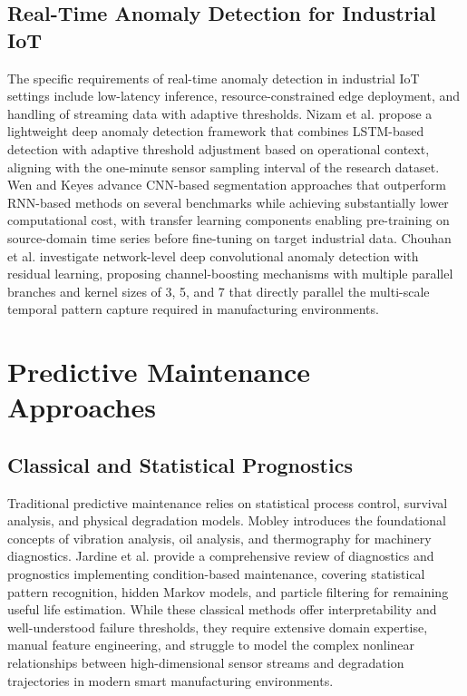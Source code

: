 \subsection{Real-Time Anomaly Detection for Industrial IoT}

The specific requirements of real-time anomaly detection in industrial IoT settings include low-latency inference, resource-constrained edge deployment, and handling of streaming data with adaptive thresholds. Nizam et al. \cite{nizam_real-time_2022} propose a lightweight deep anomaly detection framework that combines LSTM-based detection with adaptive threshold adjustment based on operational context, aligning with the one-minute sensor sampling interval of the research dataset. Wen and Keyes \cite{wen_time_2019} advance CNN-based segmentation approaches that outperform RNN-based methods on several benchmarks while achieving substantially lower computational cost, with transfer learning components enabling pre-training on source-domain time series before fine-tuning on target industrial data. Chouhan et al. \cite{Chouhan2019} investigate network-level deep convolutional anomaly detection with residual learning, proposing channel-boosting mechanisms with multiple parallel branches and kernel sizes of 3, 5, and 7 that directly parallel the multi-scale temporal pattern capture required in manufacturing environments.

\section{Predictive Maintenance Approaches}



\subsection{Classical and Statistical Prognostics}

Traditional predictive maintenance relies on statistical process control, survival analysis, and physical degradation models. Mobley \cite{mobley_introduction_2002} introduces the foundational concepts of vibration analysis, oil analysis, and thermography for machinery diagnostics. Jardine et al. \cite{jardine_review_2006} provide a comprehensive review of diagnostics and prognostics implementing condition-based maintenance, covering statistical pattern recognition, hidden Markov models, and particle filtering for remaining useful life estimation. While these classical methods offer interpretability and well-understood failure thresholds, they require extensive domain expertise, manual feature engineering, and struggle to model the complex nonlinear relationships between high-dimensional sensor streams and degradation trajectories in modern smart manufacturing environments.

